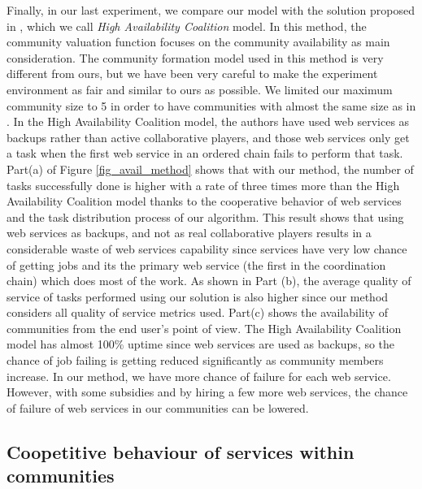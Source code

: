 Finally, in our last experiment, we compare our model with the
solution proposed in \cite{10.1109/TSC.2012.12}, which we call
\emph{High Availability Coalition} model. In this method, the
community valuation function focuses on the community availability
as main consideration. The community formation model used in this
method is very different from ours, but we have been very careful
to make the experiment environment as fair and similar to ours as
possible. We limited our maximum community size to 5 in order to
have communities with almost the same size as in
\cite{10.1109/TSC.2012.12}. In the High Availability Coalition
model, the authors have used web services as backups rather than
active collaborative players, and those web services only get a
task when the first web service in an ordered chain fails to
perform that task. %
Part(a) of Figure \ref{fig_avail_method} shows that with our
method, the number of tasks successfully done is higher with a
rate of three times more than the High Availability Coalition
model thanks to the cooperative behavior of web services and the
task distribution process of our algorithm. This result shows that
using web services as backups, and not as real collaborative
players results in a considerable waste of web services capability
since services have very low chance of getting jobs and its the
primary web service (the first in the coordination chain) which
does most of the work. As shown in Part (b), the average quality
of service of tasks performed using our solution is also higher
since our method considers all quality of service metrics used. Part(c) shows the availability of
communities from the end user's point of view. The High
Availability Coalition model has almost 100\% uptime since web
services are used as backups, so the chance of job failing is
getting reduced significantly as community members increase. In
our method, we have more chance of failure for each web service.
However, with some subsidies and by hiring a few more web
services, the chance of failure of web services in our communities
can be lowered.

\subsection*{Coopetitive behaviour of services within communities}\label{sb:resutlscoop}


